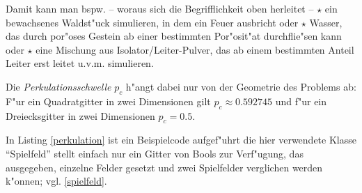 \documentclass[a4paper]{book}
\begin{document}
Damit kann man bspw. -- woraus sich die Begrifflichkeit oben herleitet
-- $\star$ ein bewachsenes Waldst"uck simulieren, in dem ein Feuer ausbricht
oder $\star$ Wasser, das durch por"oses Gestein ab einer bestimmten
Por"osit"at durchflie"sen kann oder $\star$ eine Mischung aus
Isolator/Leiter-Pulver, das ab einem bestimmten Anteil Leiter erst
leitet u.v.m. simulieren.

Die \emph{Perkulationsschwelle} $p_c$ h"angt dabei nur von der
Geometrie des Problems ab: F"ur ein Quadratgitter in zwei Dimensionen
gilt $p_c \approx 0.592745$ und f"ur ein Dreiecksgitter in zwei
Dimensionen $p_c = 0.5$.

In Listing \ref{perkulation} ist ein Beispielcode aufgef"uhrt die hier
verwendete Klasse "`Spielfeld"' stellt einfach nur ein Gitter von
Bools zur Verf"ugung, das ausgegeben, einzelne Felder gesetzt und zwei
Spielfelder verglichen werden k"onnen; vgl. \ref{spielfeld}.

 
\end{document}
